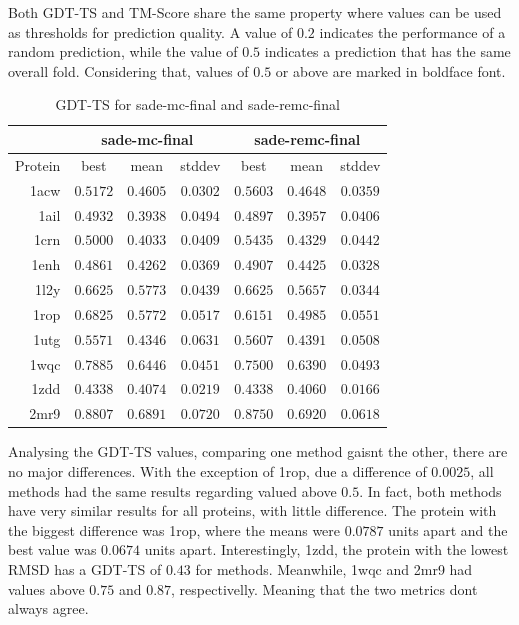 Both GDT-TS and TM-Score share the same property where values can be used as
thresholds for prediction quality. A value of $0.2$ indicates the performance of
a random prediction, while the value of $0.5$ indicates a prediction that has
the same overall fold. Considering that, values of $0.5$ or above are marked
in boldface font.

\begin{table}
  \centering
  \begin{tabular}{r|c|c|c||c|c|c}
            & \multicolumn{3}{c}{sade-mc-final} & \multicolumn{3}{||c}{sade-remc-final} \\ \hline
    Protein & best          & mean          & stddev   & best          & mean          & stddev   \\ \hline \hline
    1acw    & $\bm{0.5172}$ & $0.4605$      & $0.0302$ & $\bm{0.5603}$ & $0.4648$      & $0.0359$ \\ \hline
    1ail    & $0.4932$      & $0.3938$      & $0.0494$ & $0.4897$      & $0.3957$      & $0.0406$ \\ \hline
    1crn    & $\bm{0.5000}$ & $0.4033$      & $0.0409$ & $\bm{0.5435}$ & $0.4329$      & $0.0442$ \\ \hline
    1enh    & $0.4861$      & $0.4262$      & $0.0369$ & $0.4907$      & $0.4425$      & $0.0328$ \\ \hline
    1l2y    & $\bm{0.6625}$ & $\bm{0.5773}$ & $0.0439$ & $\bm{0.6625}$ & $\bm{0.5657}$ & $0.0344$ \\ \hline
    1rop    & $\bm{0.6825}$ & $\bm{0.5772}$ & $0.0517$ & $\bm{0.6151}$ & $0.4985$      & $0.0551$ \\ \hline
    1utg    & $\bm{0.5571}$ & $0.4346$      & $0.0631$ & $\bm{0.5607}$ & $0.4391$      & $0.0508$ \\ \hline
    1wqc    & $\bm{0.7885}$ & $\bm{0.6446}$ & $0.0451$ & $\bm{0.7500}$ & $\bm{0.6390}$ & $0.0493$ \\ \hline
    1zdd    & $0.4338$      & $0.4074$      & $0.0219$ & $0.4338$      & $0.4060$      & $0.0166$ \\ \hline
    2mr9    & $\bm{0.8807}$ & $\bm{0.6891}$ & $0.0720$ & $\bm{0.8750}$ & $\bm{0.6920}$ & $0.0618$ \\ \hline
  \end{tabular}
  \caption{GDT-TS for sade-mc-final and sade-remc-final}
  \label{tab:gdtts-data}
\end{table}

Analysing the GDT-TS values, comparing one method gaisnt the other, there are no
major differences. With the exception of 1rop, due a difference of $0.0025$, all
methods had the same results regarding valued above $0.5$. In fact, both methods
have very similar results for all proteins, with little difference. The protein
with the biggest difference was 1rop, where the means were $0.0787$ units apart
and the best value was $0.0674$ units apart. Interestingly, 1zdd, the protein
with the lowest RMSD has a GDT-TS of $0.43$ for methods. Meanwhile, 1wqc and
2mr9 had values above $0.75$ and $0.87$, respectivelly. Meaning that the two
metrics dont always agree.

